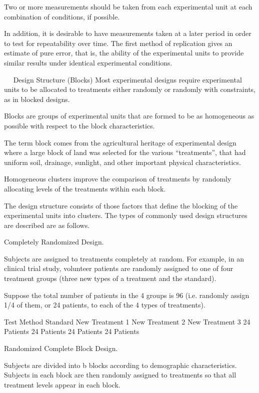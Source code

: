 Two or more measurements should be taken from each experimental unit at each combination of conditions, if possible. 

In addition, it is desirable to have measurements taken at a later period in order to test for repeatability over time. The first method of replication gives an estimate of pure error, that is, the ability of the experimental units to provide similar results under identical experimental conditions. 



 
Design Structure (Blocks)
Most experimental designs require experimental units to be allocated to treatments either randomly or randomly with constraints, as in blocked designs.

Blocks are groups of experimental units that are formed to be as homogeneous as possible with respect to the block characteristics. 

The term block comes from the agricultural heritage of experimental design where a large block of land was selected for the various “treatments”, that had uniform soil, drainage, sunlight, and other important physical characteristics.

Homogeneous clusters improve the comparison of treatments by randomly allocating levels of the treatments within each block.

The design structure consists of those factors that define the blocking of the experimental units into clusters. The types of commonly used design structures are described are as follows.

Completely Randomized Design. 

Subjects are assigned to treatments completely at random.
For example, in an clinical trial study, volunteer patients are randomly assigned to one of four treatment groups (three new types of a treatment and the standard). 

Suppose the total number of patients in the 4 groups is 96 (i.e. randomly assign 1/4 of them, or 24 patients, to each of the 4 types of treatments).


Test Method
Standard	New Treatment 1	New Treatment 2	New Treatment 3
24 Patients	24 Patients	24 Patients	24 Patients

Randomized Complete Block Design. 

Subjects are divided into b blocks according to demographic characteristics. Subjects in each block are then randomly assigned to treatments so that all treatment levels appear in each block. 

